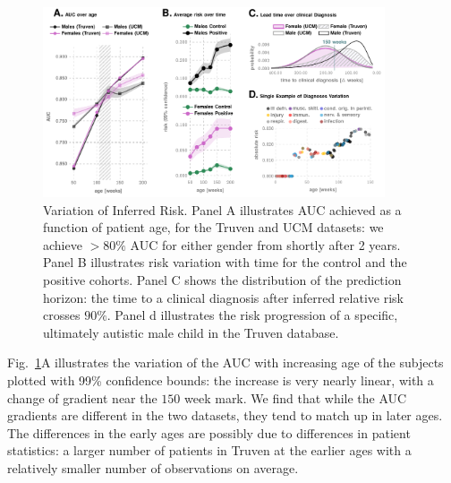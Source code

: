 \documentclass[onecolumn, compsoc,11pt]{IEEEtran}
\renewcommand{\captionN}[1]{\caption{\color{CadetBlue4!80!black} \sffamily \fontsize{9}{10}\selectfont #1  }}
\begin{document}
\begin{figure}[t]
  
  \centering 
   \includegraphics[width=0.9\textwidth]{Figures/test-figure0}
   \vspace{-15pt}

    \captionN{Variation of Inferred Risk. Panel A illustrates AUC achieved as a function of
      patient age, for the Truven and UCM datasets: we achieve $>80\%$ AUC for either gender from shortly after 2 years.   Panel B illustrates  risk variation with time for the control and the positive cohorts. Panel C shows the distribution of the prediction horizon: the time to a clinical diagnosis after inferred  relative risk crosses $90\%$. Panel d illustrates the risk progression of a specific, ultimately autistic male child in the Truven database. %
    }\label{fig2}
       \vspace{-15pt}

\end{figure}
%
Fig.~\ref{fig2}A illustrates the variation of the  AUC  with increasing age of the subjects plotted with 99\% confidence bounds: the increase is very nearly  linear, with a change of gradient near the $150$ week mark. %
We find that while the AUC gradients are different in the two datasets, they tend to match up in later ages. The differences in the early ages are possibly due to differences in patient statistics: a larger number of patients in Truven at the earlier ages with a relatively smaller number of observations on average.
\end{document}
